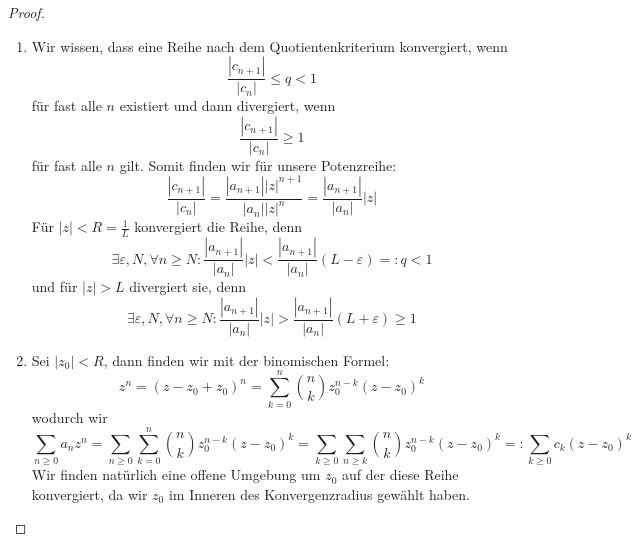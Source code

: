 \documentclass[11pt]{article}
\begin{document}
    \begin{proof}
        \begin{enumerate}[label=(\alph*)]
            \item Wir wissen, dass eine Reihe nach dem Quotientenkriterium konvergiert, wenn
            $$\frac{|c_{n+1}|}{|c_n|}\leq q<1$$
            für fast alle $n$ existiert und dann divergiert, wenn
            $$\frac{|c_{n+1}|}{|c_n|}\geq 1$$
            für fast alle $n$ gilt. Somit finden wir für unsere Potenzreihe:
            $$\frac{|c_{n+1}|}{|c_n|} = \frac{|a_{n+1}||z|^{n+1}}{|a_n||z|^n} =
            \frac{|a_{n+1}|}{|a_n|}|z|$$
            Für $|z|<R=\frac{1}{L}$ konvergiert die Reihe, denn
            $$\exists \varepsilon, N, \forall n\geq N: \frac{|a_{n+1}|}{|a_n|}|z|<
            \frac{|a_{n+1}|}{|a_n|}(L-\varepsilon)=: q <1 $$
            und für $|z|>L$ divergiert sie, denn
            $$\exists \varepsilon, N, \forall n\geq N: \frac{|a_{n+1}|}{|a_n|}|z|>
            \frac{|a_{n+1}|}{|a_n|}(L+\varepsilon)\geq 1$$
            \item Sei $|z_0|<R$, dann finden wir mit der binomischen Formel:
            $$z^n=(z-z_0+z_0)^n = \sum_{k=0}^n \binom{n}{k} z_0^{n-k}(z-z_0)^k$$
            wodurch wir
            $$\sum_{n\geq 0}a_n z^n = \sum_{n\geq 0}\sum_{k=0}^n \binom{n}{k} z_0^{n-k}(z-z_0)^k
            = \sum_{k\geq 0}\sum_{n\geq k} \binom{n}{k} z_0^{n-k}(z-z_0)^k
            =:\sum_{k\geq 0}c_k(z-z_0)^k $$
            Wir finden natürlich eine offene Umgebung um $z_0$ auf der diese Reihe konvergiert, da wir
            $z_0$ im Inneren des Konvergenzradius gewählt haben.
        \end{enumerate}
    \end{proof}
\end{document}
